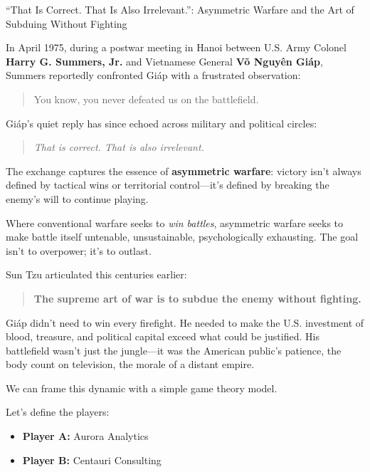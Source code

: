 \begin{HistoricalSidebar}{“That Is Correct. That Is Also Irrelevant.”: Asymmetric Warfare and the Art of Subduing Without Fighting}

  In April 1975, during a postwar meeting in Hanoi between U.S. Army Colonel \textbf{Harry G. Summers, Jr.} and Vietnamese General \textbf{Võ Nguyên Giáp}, Summers reportedly confronted Giáp with a frustrated observation:
  
  \begin{quote}
  You know, you never defeated us on the battlefield.
  \end{quote}
  
  Giáp’s quiet reply has since echoed across military and political circles:
  
  \begin{quote}
  \textit{That is correct. That is also irrelevant.}
  \end{quote}
  
  The exchange captures the essence of \textbf{asymmetric warfare}: victory isn’t always defined by tactical wins or territorial control—it’s defined by breaking the enemy’s will to continue playing.

  \medskip
  
  Where conventional warfare seeks to \textit{win battles}, asymmetric warfare seeks to make battle itself untenable, unsustainable, psychologically exhausting. The goal isn’t to overpower; it’s to outlast.

  \medskip
  
  Sun Tzu articulated this centuries earlier:
  
  \begin{quote}
  \textbf{The supreme art of war is to subdue the enemy without fighting.}
  \end{quote}
  
  Giáp didn’t need to win every firefight. He needed to make the U.S. investment of blood, treasure, and political capital exceed what could be justified. His battlefield wasn’t just the jungle—it was the American public’s patience, the body count on television, the morale of a distant empire.
  
\end{HistoricalSidebar}

\medskip

We can frame this dynamic with a simple game theory model.

Let’s define the players:

\begin{itemize}
  \item \textbf{Player A:} Aurora Analytics
  \item \textbf{Player B:} Centauri Consulting
\end{itemize}


